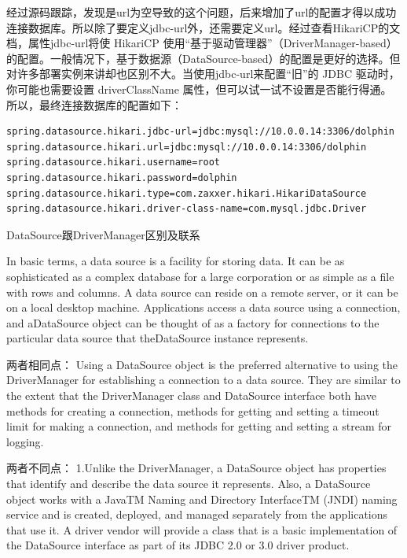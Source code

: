 \documentclass[11pt,fleqn]{book}
\makeatletter
\numberwithin{dummy}{section}
\theoremstyle{ocrenumbox}
\theoremstyle{blacknumex}
\theoremstyle{blacknumbox}
\theoremstyle{ocrenum}
\renewcommand\paragraph{\@startsection{paragraph}{4}{\z@}
	{-2ex \@plus-.2ex \@minus .2ex}
	{.1ex}
	{\normalfont\small\sffamily\bfseries}}
\makeatother
\begin{document}
经过源码跟踪，发现是url为空导致的这个问题，后来增加了url的配置才得以成功连接数据库。所以除了要定义jdbc-url外，还需要定义url。经过查看HikariCP的文档，属性jdbc-url将使 HikariCP 使用“基于驱动管理器”（DriverManager-based）的配置。一般情况下，基于数据源（DataSource-based）的配置是更好的选择。但对许多部署实例来讲却也区别不大。当使用jdbc-url来配置“旧”的 JDBC 驱动时，你可能也需要设置 driverClassName 属性，但可以试一试不设置是否能行得通。所以，最终连接数据库的配置如下：

\begin{lstlisting}
spring.datasource.hikari.jdbc-url=jdbc:mysql://10.0.0.14:3306/dolphin
spring.datasource.hikari.url=jdbc:mysql://10.0.0.14:3306/dolphin
spring.datasource.hikari.username=root
spring.datasource.hikari.password=dolphin
spring.datasource.hikari.type=com.zaxxer.hikari.HikariDataSource
spring.datasource.hikari.driver-class-name=com.mysql.jdbc.Driver
\end{lstlisting}


\paragraph{DataSource跟DriverManager区别及联系}

In basic terms, a data source is a facility for storing data. It can be as sophisticated as a complex database for a large corporation or as simple as a file with rows and columns. A data source can reside on a remote server, or it can be on a local desktop machine. Applications access a data source using a connection, and aDataSource object can be thought of as a factory for connections to the particular data source that theDataSource instance represents.

两者相同点：
Using a DataSource object is the preferred alternative to using the DriverManager for establishing a connection to a data source. They are similar to the extent that the DriverManager class and DataSource interface both have methods for creating a connection, methods for getting and setting a timeout limit for making a connection, and methods for getting and setting a stream for logging.

两者不同点：
1.Unlike the DriverManager, a DataSource object has properties that identify and describe the data source it represents. Also, a DataSource object works with a JavaTM Naming and Directory InterfaceTM (JNDI) naming service and is created, deployed, and managed separately from the applications that use it. A driver vendor will provide a class that is a basic implementation of the DataSource interface as part of its JDBC 2.0 or 3.0 driver product.
\end{document}
